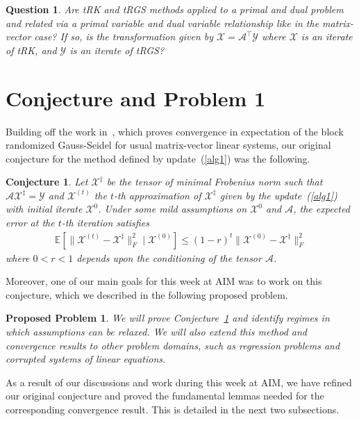 \documentclass[10.5pt]{amsart}
\newtheorem{PropProb}{Proposed Problem}
\newtheorem{conjecture}{Conjecture}
\newtheorem{question}{Question}
\newcommand{\tens}[1]{\bm{\mathcal{#1}}}
\def\tA{{\tens{A}}}  %
\def\tX{{\tens{X}}}  %
\def\tY{{\tens{Y}}}
\begin{document}
\begin{question}
    Are tRK and tRGS methods applied to a primal and dual problem and related via a primal variable and dual variable relationship like in the matrix-vector case?  If so, is the transformation given by $\tX = \tA^\top \tY$ where $\tX$ is an iterate of tRK, and $\tY$ is an iterate of tRGS? \label{ques:duality of tensor methods}
\end{question}



\section{Conjecture and Problem 1}
Building off the work in~\cite{wu2018convergence}, which proves convergence in expectation of the block randomized Gauss-Seidel for usual matrix-vector linear systems, our original conjecture for the method defined by update~(\ref{alg1}) was the following.
\begin{conjecture}
    Let $\tX^\ddagger$ be the tensor of minimal Frobenius norm such that $\tA \tX^\ddagger = \tY$ and $\tX^{(t)}$ the $t$-th approximation of $\tX^\ddagger$ given by the update~(\ref{alg1}) with initial iterate $\tX^0$. 
    Under some mild assumptions on  $\tX^0$ and  $\tA$, the expected error at the $t$-th iteration satisfies
    \begin{align*}
        \mathbb{E}\left[ \| \tX^{(t)} - \tX^\ddagger \|^2_F \mid \tX^{(0)} \right] \leq (1 - r)^t \| \tX^{(0)} - \tX^\ddagger \|^2_F
    \end{align*}
    where $0 < r < 1$ depends upon the conditioning of the tensor $\tA$.\label{conj}
\end{conjecture}

Moreover, one of our main goals for this week at AIM was to work on this conjecture, which we described in the following proposed problem.
\begin{PropProb}
   We will prove Conjecture~\ref{conj} and identify regimes in which assumptions can be relaxed.  We will also extend this method and convergence results to other problem domains, such as regression problems and corrupted systems of linear equations. 
\end{PropProb}
As a result of our discussions and work during this week at AIM, we have refined our original conjecture and proved the fundamental lemmas needed for the corresponding convergence result. This is detailed in the next two subsections.
\end{document}
